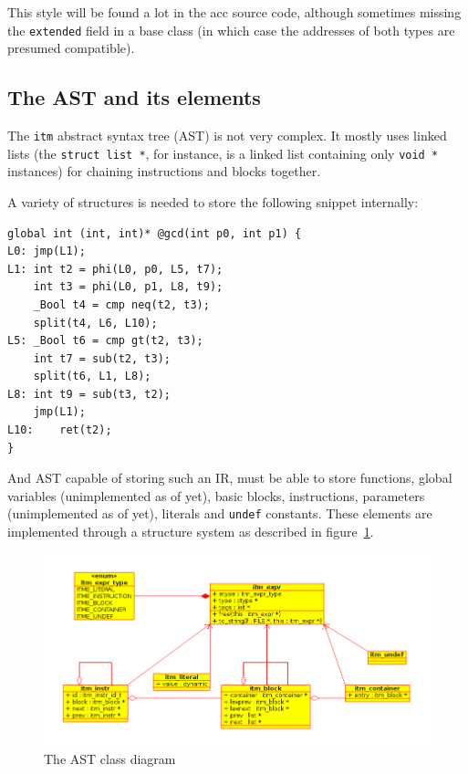 \documentclass[12pt, a4paper]{article}
\begin{document}
This style will be found a lot in the acc source code, although sometimes
missing the \verb+extended+ field in a base class (in which case the addresses
of both types are presumed compatible).

  \subsection{The AST and its elements}
The \verb+itm+ abstract syntax tree (AST) is not very complex. It mostly uses
linked lists (the \verb+struct list *+, for instance, is a linked list containing
only \verb+void *+ instances) for chaining instructions and blocks together.

A variety of structures is needed to store the following snippet internally:

\begin{lstlisting}
global int (int, int)* @gcd(int p0, int p1) {
L0:	jmp(L1);
L1:	int t2 = phi(L0, p0, L5, t7);
	int t3 = phi(L0, p1, L8, t9);
	_Bool t4 = cmp neq(t2, t3);
	split(t4, L6, L10);
L5:	_Bool t6 = cmp gt(t2, t3);
	int t7 = sub(t2, t3);
	split(t6, L1, L8);
L8:	int t9 = sub(t3, t2);
	jmp(L1);
L10:	ret(t2);
}
\end{lstlisting}

And AST capable of storing such an IR, must be able to store functions, global
variables (unimplemented as of yet), basic blocks, instructions, parameters
(unimplemented as of yet), literals and \verb+undef+ constants. These elements
are implemented through a structure system as described in figure~\ref{fig:ast}.

\begin{figure}[h]
\begin{center}
\includegraphics[resolution=150]{ast.png}
\caption{The AST class diagram}
\label{fig:ast}
\end{center}
\end{figure}
\end{document}
